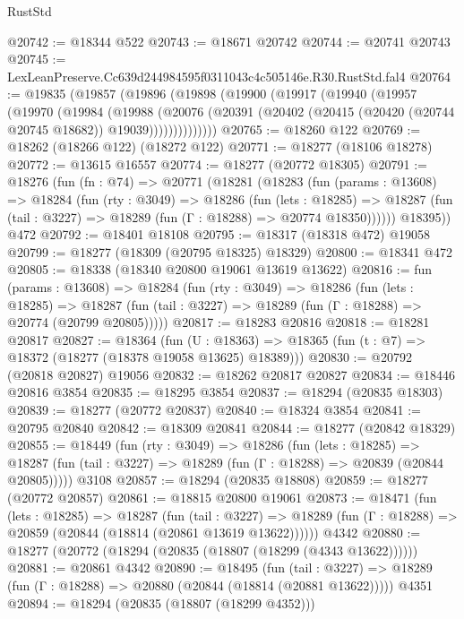 \begin{lexlean}{RustStd}
\begin{coremodule}
@20742 := @18344 @522
@20743 := @18671 @20742
@20744 := @20741 @20743
@20745 := LexLeanPreserve.Cc639d244984595f0311043c4c505146e.R30.RustStd.fal4
@20764 := @19835
    (@19857
      (@19896
        (@19898
          (@19900
            (@19917
              (@19940
                (@19957
                  (@19970
                    (@19984
                      (@19988
                        (@20076
                          (@20391
                            (@20402 (@20415 (@20420 (@20744 @20745 @18682)) @19039))))))))))))))
@20765 := @18260 @122
@20769 := @18262 (@18266 @122) (@18272 @122)
@20771 := @18277 (@18106 @18278)
@20772 := @13615 @16557
@20774 := @18277 (@20772 @18305)
@20791 := @18276
    (fun (fn : @74) =>
    @20771
      (@18281
        (@18283
          (fun (params : @13608) =>
          @18284
            (fun (rty : @3049) =>
            @18286
              (fun (lets : @18285) =>
              @18287 (fun (tail : @3227) => @18289 (fun (Γ : @18288) => @20774 @18350))))))
        @18395))
    @472
@20792 := @18401 @18108
@20795 := @18317 (@18318 @472) @19058
@20799 := @18277 (@18309 (@20795 @18325) @18329)
@20800 := @18341 @472
@20805 := @18338 (@18340 @20800 @19061 @13619 @13622)
@20816 := fun (params : @13608) =>
  @18284
    (fun (rty : @3049) =>
    @18286
      (fun (lets : @18285) =>
      @18287 (fun (tail : @3227) => @18289 (fun (Γ : @18288) => @20774 (@20799 @20805)))))
@20817 := @18283 @20816
@20818 := @18281 @20817
@20827 := @18364
    (fun (U : @18363) => @18365 (fun (t : @7) => @18372 (@18277 (@18378 @19058 @13625) @18389)))
@20830 := @20792 (@20818 @20827) @19056
@20832 := @18262 @20817 @20827
@20834 := @18446 @20816 @3854
@20835 := @18295 @3854
@20837 := @18294 (@20835 @18303)
@20839 := @18277 (@20772 @20837)
@20840 := @18324 @3854
@20841 := @20795 @20840
@20842 := @18309 @20841
@20844 := @18277 (@20842 @18329)
@20855 := @18449
    (fun (rty : @3049) =>
    @18286
      (fun (lets : @18285) =>
      @18287 (fun (tail : @3227) => @18289 (fun (Γ : @18288) => @20839 (@20844 @20805)))))
    @3108
@20857 := @18294 (@20835 @18808)
@20859 := @18277 (@20772 @20857)
@20861 := @18815 @20800 @19061
@20873 := @18471
    (fun (lets : @18285) =>
    @18287
      (fun (tail : @3227) =>
      @18289 (fun (Γ : @18288) => @20859 (@20844 (@18814 (@20861 @13619 @13622))))))
    @4342
@20880 := @18277 (@20772 (@18294 (@20835 (@18807 (@18299 (@4343 @13622))))))
@20881 := @20861 @4342
@20890 := @18495
    (fun (tail : @3227) => @18289 (fun (Γ : @18288) => @20880 (@20844 (@18814 (@20881 @13622)))))
    @4351
@20894 := @18294 (@20835 (@18807 (@18299 @4352)))

\end{coremodule}
\end{lexlean}
